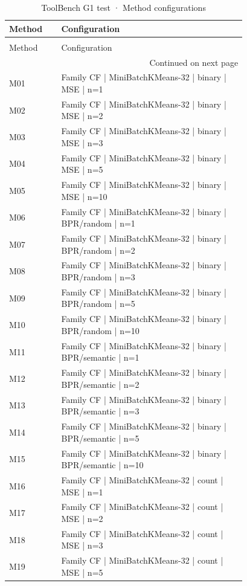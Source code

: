 \begin{longtable}{lp{0.78\linewidth}}
\caption{ToolBench G1 test · Method configurations} \label{tab:ToolBench-G1-test-family-family-methods} \\
\toprule
Method & Configuration \\
\midrule
\endfirsthead
\caption[]{ToolBench G1 test · Method configurations} \\
\toprule
Method & Configuration \\
\midrule
\endhead
\midrule
\multicolumn{2}{r}{Continued on next page} \\
\midrule
\endfoot
\bottomrule
\endlastfoot
M01 & Family CF | MiniBatchKMeans-32 | binary | MSE | n=1 \\
M02 & Family CF | MiniBatchKMeans-32 | binary | MSE | n=2 \\
M03 & Family CF | MiniBatchKMeans-32 | binary | MSE | n=3 \\
M04 & Family CF | MiniBatchKMeans-32 | binary | MSE | n=5 \\
M05 & Family CF | MiniBatchKMeans-32 | binary | MSE | n=10 \\
M06 & Family CF | MiniBatchKMeans-32 | binary | BPR/random | n=1 \\
M07 & Family CF | MiniBatchKMeans-32 | binary | BPR/random | n=2 \\
M08 & Family CF | MiniBatchKMeans-32 | binary | BPR/random | n=3 \\
M09 & Family CF | MiniBatchKMeans-32 | binary | BPR/random | n=5 \\
M10 & Family CF | MiniBatchKMeans-32 | binary | BPR/random | n=10 \\
M11 & Family CF | MiniBatchKMeans-32 | binary | BPR/semantic | n=1 \\
M12 & Family CF | MiniBatchKMeans-32 | binary | BPR/semantic | n=2 \\
M13 & Family CF | MiniBatchKMeans-32 | binary | BPR/semantic | n=3 \\
M14 & Family CF | MiniBatchKMeans-32 | binary | BPR/semantic | n=5 \\
M15 & Family CF | MiniBatchKMeans-32 | binary | BPR/semantic | n=10 \\
M16 & Family CF | MiniBatchKMeans-32 | count | MSE | n=1 \\
M17 & Family CF | MiniBatchKMeans-32 | count | MSE | n=2 \\
M18 & Family CF | MiniBatchKMeans-32 | count | MSE | n=3 \\
M19 & Family CF | MiniBatchKMeans-32 | count | MSE | n=5 \\

\end{longtable}
